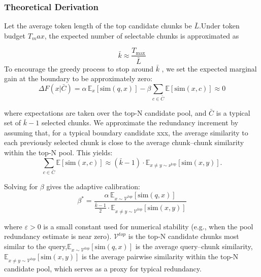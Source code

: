 \documentclass[11pt]{article}
\begin{document}
\subsubsection{Theoretical Derivation}

Let the average token length of the top candidate chunks be $\bar{L}$.Under token budget $T_max$, the expected number of selectable chunks is approximated as

\begin{equation}
  \label{eq:example}
  \bar{k} \approx \frac{T_{\max}}{\bar{L}}
\end{equation}
To encourage the greedy process to stop around $\bar{k}$ , we set the expected marginal gain at the boundary to be approximately zero:
\begin{equation}
  \label{eq:example}
  \Delta F(x|\bar{C}) = \alpha\,\mathbb{E}_{x}[\mathrm{sim}(q, x)] - \beta \sum_{c\in\bar{C}} \mathbb{E}[\mathrm{sim}(x, c)] \approx 0
\end{equation}

where expectations are taken over the top-N candidate pool, and $\bar{C}$ is a typical set of $\bar{k}-1$ selected chunks.
We approximate the redundancy increment by assuming that, for a typical boundary candidate xxx, the average similarity to each previously selected chunk is close to the average chunk–chunk similarity within the top-N pool. This yields:
\begin{equation}
  \label{eq:example}
  \sum_{c \in \bar{C}} \mathbb{E}[\mathrm{sim}(x, c)] \approx (\bar{k} - 1) \cdot \mathbb{E}_{x \neq y \sim \nu^{\mathrm{top}}} [\mathrm{sim}(x, y)].
\end{equation}

Solving for $\beta$ gives the adaptive calibration:
\begin{equation}
  \label{eq:example}
  \beta^* = \frac{\alpha\,\mathbb{E}_{x\sim \mathcal{V}^{top}}[\mathrm{sim}(q, x)]} {\frac{\bar{k}-1}{2} \cdot \mathbb{E}_{x\neq y \sim \mathcal{V}^{top}}[\mathrm{sim}(x, y)]}
\end{equation}

where $\varepsilon >0 $ is a small constant used for numerical stability (e.g., when the pool redundancy estimate is near zero).
$\mathcal{V}^{top}$ is the top-N candidate chunks most similar to the query,$\mathbb{E}_{x\sim \mathcal{V}^{top}}[\mathrm{sim}(q,x)]$ is the average query–chunk similarity,$\mathbb{E}_{x\neq y\sim \mathcal{V}^{top}}[\mathrm{sim}(x,y)]$ is the average pairwise similarity within the top-N candidate pool, which serves as a proxy for typical redundancy.
\end{document}
